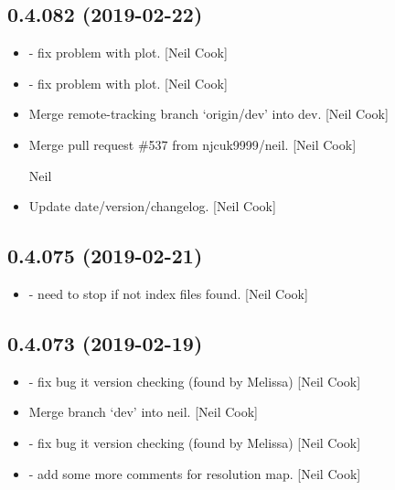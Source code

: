 \documentclass[a4paper,10pt,english]{report}
\begin{document}
\subsection{0.4.082 (2019-02-22)}
\label{\detokenize{misc/changelog:id181}}\begin{itemize}
\item {} 
 - fix problem with  plot. {[}Neil
Cook{]}

\item {} 
 - fix problem with 
plot. {[}Neil Cook{]}

\item {} 
Merge remote-tracking branch ‘origin/dev’ into dev. {[}Neil Cook{]}

\item {} 
Merge pull request \#537 from njcuk9999/neil. {[}Neil Cook{]}

Neil

\item {} 
Update date/version/changelog. {[}Neil Cook{]}

\end{itemize}


\subsection{0.4.075 (2019-02-21)}
\label{\detokenize{misc/changelog:id182}}\begin{itemize}
\item {} 
 - need to stop if not index files found. {[}Neil Cook{]}

\end{itemize}


\subsection{0.4.073 (2019-02-19)}
\label{\detokenize{misc/changelog:id183}}\begin{itemize}
\item {} 
 - fix bug it version checking (found by
Melissa) {[}Neil Cook{]}

\item {} 
Merge branch ‘dev’ into neil. {[}Neil Cook{]}

\item {} 
 - fix bug it version checking (found by
Melissa) {[}Neil Cook{]}

\item {} 
 - add some more comments for resolution map. {[}Neil Cook{]}

\end{itemize}
\end{document}
